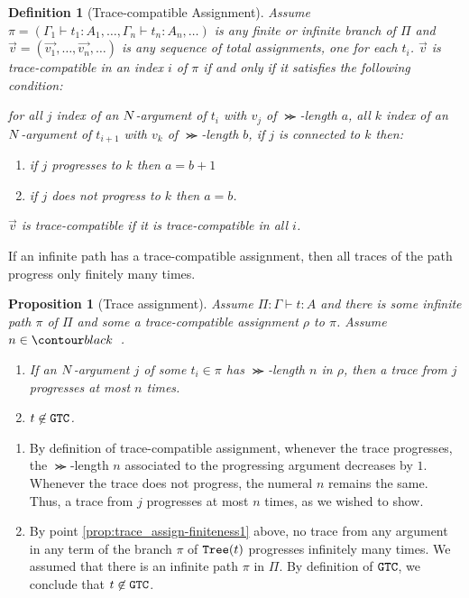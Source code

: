 \documentclass{article}
\newtheorem{proposition}[theorem]{Proposition}
\newtheorem{definition}[theorem]{Definition}
\newenvironment{proof}[1][Proof]{\begin{trivlist}
\item[\hskip \labelsep {\bfseries #1}]}{\end{trivlist}}
\begin{document}
\begin{definition}[Trace-compatible Assignment]
\label{definition-trace-compatible}
Assume $\pi  = (\Gamma_1 \vdash t_1:A_1, \ldots, \Gamma_n \vdash t_n:A_n, \ldots)$ 
is any finite or infinite branch of $\Pi$
and $\vec{v} = (\vec{v_1}, \ldots, \vec{v_n}, \ldots)$ 
is any sequence of total assignments, one for each $t_i$. 
$\vec{v}$ is \emph{trace-compatible} in an index $i$ of $\pi$  
if and only if it satisfies the following condition:

  for all $j$  index of an ${N}$-argument of $t_i$ with $v_j$ of $\Succ$-length $a$, 
  all $k$ index of an ${N}$-argument of $t_{i+1}$ with $v_k$ of $\Succ$-length $b$, 
  if $j$ is connected to $k$ then:
 \begin{enumerate}
 \item
 if $j$ progresses to $k$ then $a=b+1$
 \item
 if $j$ does not progress to $k$ then $a=b$.
 \end{enumerate}
$\vec{v}$ is \emph{trace-compatible} if it is trace-compatible in all $i$.
\end{definition}

If an infinite path has a trace-compatible assignment, 
then all traces of the path progress only finitely many times.

\begin{proposition}[Trace assignment]
\label{prop:trace_assign-finiteness}
Assume $\Pi:\Gamma \vdash t:A$ and there is some infinite path $\pi$ of $\Pi$ and
some a trace-compatible assignment  $\rho$ to $\pi$. Assume $n \in \Nat$.
\begin{enumerate}
\item
\label{prop:trace_assign-finiteness1}
If an ${N}$-argument $j$ of some $t_i \in \pi$ has $\Succ$-length $n$ in $\rho$, then a trace
from $j$ progresses at most $n$ times.
\item
\label{prop:trace_assign-finiteness2}
$t \not \in {\tt GTC}$.
\end{enumerate}
\end{proposition}

\begin{proof}
\begin{enumerate}
\item
By definition of trace-compatible assignment, whenever the trace progresses, 
the $\Succ$-length $n$ associated to the progressing argument decreases by $1$.
Whenever the trace does not progress, the numeral $n$ remains the same.
Thus, a trace from $j$ progresses at most $n$ times, as we wished to show.
\item
By point \ref{prop:trace_assign-finiteness1} above, 
no trace from any argument in any term of the branch $\pi$ of ${\tt Tree}(t)$ progresses infinitely many times.
We assumed that there is an infinite path $\pi$ in $\Pi$.
By definition of ${\tt GTC}$, we conclude that $t \not \in {\tt GTC}$. 
\end{enumerate}
\end{proof}
\end{document}
